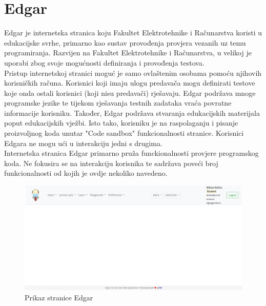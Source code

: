 \documentclass[times, utf8, zavrsni]{fer}
\begin{document}
	\section{Edgar}
	Edgar je internetska stranica koju Fakultet Elektrotehnike i Računarstva koristi u edukacijske svrhe, primarno kao sustav provođenja provjera vezanih uz temu programiranja. Razvijen na Fakultet Elektrotehnike i Računarstva, u velikoj je uporabi zbog svoje mogućnosti definiranja i provođenja testova. \\
	Pristup internetskoj stranici moguć je samo ovlaštenim osobama pomoću njihovih korisničkih računa. Korisnici koji imaju ulogu predavača mogu definirati testove koje onda ostali korisnici (koji nisu predavači) rješavaju. Edgar podržava mnoge programske jezike te tijekom rješavanja testnih zadataka vraća povratne informacije korisniku. Također, Edgar podržava stvaranja edukacijskih materijala poput edukacijskih vježbi. Isto tako, korisniku je na raspolaganju i pisanje proizvoljnog koda unutar "Code sandbox" funkcionalnosti stranice. Korisnici Edgara ne mogu ući u interakciju jedni s drugima.\\
	Internetska stranica Edgar primarno pruža funckionalnosti provjere programskog koda. Ne fokusira se na interakciju korisnika te sadržava poveći broj funkcionalnosti od kojih je ovdje nekoliko navedeno.
	\begin{figure}[H]
		\centering
		\includegraphics[width=\linewidth]{pictures/prikazi/Edgar.png}
		\caption{Prikaz stranice Edgar}
		\label{fig:edgar}
	\end{figure}
	
\end{document}

